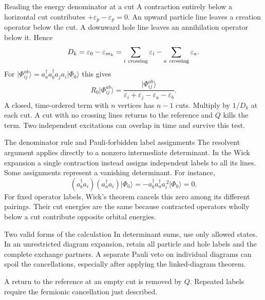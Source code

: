 \documentclass[aspectratio=169,10pt]{beamer}
\newcommand{\ket}[1]{\vert #1\rangle}
\newcommand{\cre}[1]{a_{#1}^{\dagger}}
\newcommand{\ann}[1]{a_{#1}}
\newcommand{\ph}{\Phi_0}
\begin{document}
\begin{frame}{Reading the energy denominator at a cut}
A contraction entirely below a horizontal cut contributes $+\varepsilon_p-\varepsilon_p=0$. An upward particle line leaves a creation operator below the cut. A downward hole line leaves an annihilation operator below it. Hence
\[
 D_k=\varepsilon_0-\varepsilon_{m_k}
 =\sum_{i\ {\rm crossing}}\varepsilon_i-\sum_{a\ {\rm crossing}}\varepsilon_a.
\]
For $\ket{\Phi_{ij}^{ab}}=\cre{a}\cre{b}\ann{j}\ann{i}\ket{\ph}$ this gives
\[
 R_0\ket{\Phi_{ij}^{ab}}=
 \frac{\ket{\Phi_{ij}^{ab}}}{\varepsilon_i+\varepsilon_j-\varepsilon_a-\varepsilon_b}.
\]
A closed, time-ordered term with $n$ vertices has $n-1$ cuts. Multiply by $1/D_k$ at each cut. A cut with no crossing lines returns to the reference and $Q$ kills the term. Two independent excitations can overlap in time and survive this test.
\end{frame}

\begin{frame}{The denominator rule and Pauli-forbidden label assignments}
The resolvent argument applies directly to a nonzero intermediate determinant. In the Wick expansion a single contraction instead assigns independent labels to all its lines. Some assignments represent a vanishing determinant. For instance,
\[
 (\cre{b}\ann{i})(\cre{a}\ann{i})\ket{\ph}
 =-\cre{b}\cre{a}\ann{i}^{\,2}\ket{\ph}=0.
\]
For fixed operator labels, Wick's theorem cancels this zero among its different pairings. Their cut energies are the same because contracted operators wholly below a cut contribute opposite orbital energies.
\begin{block}{Two valid forms of the calculation}
In determinant sums, use only allowed states. In an unrestricted diagram expansion, retain all particle and hole labels and the complete exchange partners. A separate Pauli veto on individual diagrams can spoil the cancellations, especially after applying the linked-diagram theorem.
\end{block}
A return to the reference at an empty cut is removed by $Q$. Repeated labels require the fermionic cancellation just described.
\end{frame}
\end{document}
